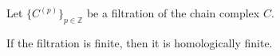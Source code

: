 Let $\{C^{(p)}\}_{p \in \mathbb{Z}}$ be a filtration of the chain complex $C$.

If the filtration is finite, then it is homologically finite.
